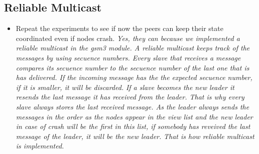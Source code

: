 \subsection{Reliable Multicast}
\begin{itemize}
\item Repeat the experiments to see if now the peers can keep their state coordinated even if nodes crash.
\newline\textit{Yes, they can because we implemented a reliable multicast in the gsm3 module. A reliable multicast keeps track of the messages by using secuence numbers. Every slave that receives a message compares its secuence number to the secuence number of the last one that is has delivered. If the incoming message has the the expected secuence number, if it is smaller, it will be discarded.}
\newline\textit{If a slave becomes the new leader it resends the last message it has received from the leader. That is why every slave always stores the last received message. As the leader always sends the messages in the order as the nodes appear in the view list and the new leader in case of crash will be the first in this list, if somebody has reveived the last message of the leader, it will be the new leader.}
\newline\textit{That is how reliable multicast is implemented.}
\end{itemize}

